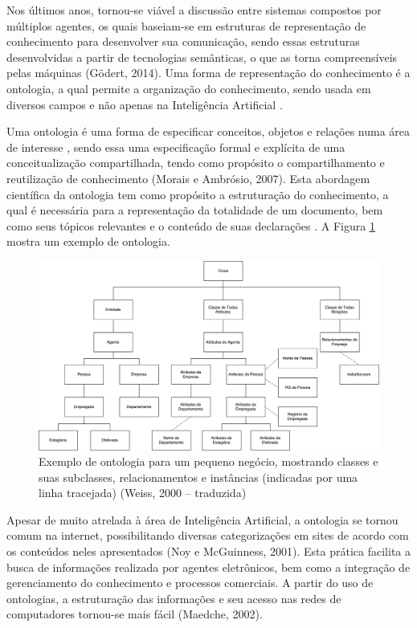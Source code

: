Nos últimos anos, tornou-se viável a discussão entre sistemas compostos por múltiplos agentes, os quais baseiam-se em estruturas de representação de conhecimento para desenvolver sua comunicação, sendo essas estruturas desenvolvidas a partir de tecnologias semânticas, o que as torna compreensíveis pelas máquinas (Gödert, 2014)\nocite{godert2014}. Uma forma de representação do conhecimento é a ontologia, a qual permite a organização do conhecimento, sendo usada em diversos campos e não apenas na Inteligência Artificial \cite{ONTOLOGIAI}.

Uma  ontologia  é  uma  forma  de  especificar  conceitos,  objetos  e  relações  numa área de interesse \cite{WEISS1999}, sendo essa uma especificação formal e explícita de uma conceitualização compartilhada, tendo como propósito o compartilhamento e reutilização de conhecimento (Morais e Ambrósio, 2007).  Esta abordagem científica da ontologia tem como propósito a estruturação do conhecimento, a qual é necessária para a representação da totalidade de um documento, bem como seus tópicos relevantes e o conteúdo de suas declarações \cite{godert2014}. A Figura \ref{fig:ontologia} mostra um exemplo de ontologia.

\begin{figure}[H]
    \centering
    \caption[Exemplo de Ontologia]{\label{fig:ontologia}Exemplo de ontologia para um pequeno negócio, mostrando classes e suas subclasses, relacionamentos e instâncias (indicadas por uma linha tracejada) (Weiss, 2000 -- traduzida)}
    \includegraphics[width=1\textwidth]{pdf/ontology-weiss.pdf}
\end{figure}

Apesar de muito atrelada à área de Inteligência Artificial, a ontologia se tornou comum na internet, possibilitando diversas categorizações em sites de acordo com os conteúdos neles apresentados (Noy e McGuinness, 2001). Esta prática facilita a busca de informações realizada por agentes eletrônicos, bem como a integração de gerenciamento do conhecimento e processos comerciais. A partir do uso de ontologias, a estruturação das informações e seu acesso nas redes de computadores tornou-se mais fácil (Maedche, 2002)\nocite{MAEDCHE2002}.

